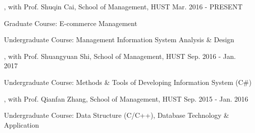 \vspace{-2.0mm}

\begin{cventries}
\vspace{-3mm}

\cvexperience
{, with Prof. Shuqin Cai, School of Management, HUST}
{Mar. 2016 - PRESENT}
{
    \begin{cvitems}
    \item {Graduate Course: E-commerce Management}
    \item {Undergraduate Course: Management Information System Analysis \& Design}
    \end{cvitems}
}

\cvexperience
{, with Prof. Shuangyuan Shi, School of Management, HUST}
{Sep. 2016 - Jan. 2017}
{
    \begin{cvitems}
    \item {Undergraduate Course: Methods \& Tools of Developing Information System (C\#)}
    \end{cvitems}
}

\cvexperience
{, with Prof. Qianfan Zhang, School of Management, HUST}
{Sep. 2015 - Jan. 2016}
{
    \begin{cvitems}
    \item {Undergraduate Course: Data Structure (C/C++), Database Technology \& Application}
    \end{cvitems}
}

\end{cventries}